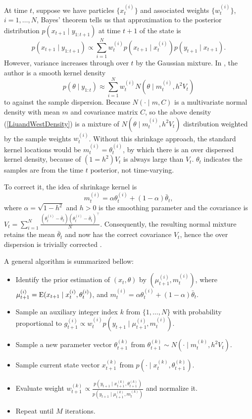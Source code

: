 At time $t$, suppose we have particles $\{x_t^{(i)}\}$ and associated weights $\{w_t^{(i)}\}$, $i=1,\dots,N$, Bayes' theorem tells us that approximation to the posterior distribution $p(x_{t+1}\mid y_{1:t+1})$ at time $t+1$ of the state is 
\begin{equation*}
p(x_{t+1} \mid y_{1:t+1}) \propto \sum_{i=1}^{N} w_t^{(i)} p(x_{t+1} \mid x_t^{(i)})p(y_{t+1}\mid x_{t+1}).
\end{equation*}
However, variance increases through over $t$ by the Gaussian mixture. In \cite{west1993mixture}, the author is a smooth kernel density 
\begin{equation}\label{LiuandWestDensity}
p(\theta\mid y_{1:t})\approx \sum_{i=1}^{N}w_t^{(i)} N(\theta\mid m_t^{(i)},h^2V_t)
\end{equation}
to against the sample dispersion. Because $N(\cdot\mid m,C)$ is a multivariate normal density with mean $m$ and covariance matrix $C$, so the above density (\ref{LiuandWestDensity}) is a mixture of $N(\theta\mid m_t^{(i)},h^2V_t)$ distribution weighted by the sample weights $w_t^{(i)}$. Without this shrinkage approach, the standard kernel locations would be $m_t^{(i)}=\theta_t^{(i)}$, by which there is an over dispersed kernel density, because of $(1=h^2)V_t$ is always large than $V_t$. $\theta_t$ indicates the samples are from the time $t$ posterior, not time-varying. 

To correct it, the idea of shrinkage kernel is 
\begin{equation}
m_t^{(i)}=\alpha \theta_t^{(i)} + (1-\alpha)\bar{\theta}_t,
\end{equation}
where $\alpha=\sqrt{1-h^2}$ and $h>0$ is the smoothing parameter and the covariance is $V_t=\sum_{i=1}^{N}\frac{ (\theta_t^{(i)}-\bar{\theta}_t )(\theta_t^{(i)}-\bar{\theta}_t  )^\top}{N}$. Consequently, the resulting normal mixture retains the mean $\bar{\theta}_t$ and now has the correct covariance $V_t$, hence the over dispersion is trivially corrected \cite{liu2001combined}. 

A general algorithm is summarized bellow: 
\begin{itemize}
\item Identify the prior estimation of $(x_t,\theta)$ by $(\mu_{t+1}^{(i)},m_t^{(i)})$, where
$\mu_{t+1}^{(i)}=\mathrm{E} (x_{t+1}\mid x_t^{(i)},\theta_t^{(i)})$, and $m_t^{(i)}=\alpha \theta_t^{(i)} + (1-\alpha)\bar{\theta}_t$.
\item Sample an auxiliary integer index $k$ from $\{1,\dots,N\}$ with probability proportional to $g_{t+1}^{(i)}\propto w_t^{(i)}p(y_{t+1}\mid \mu_{t+1}^{(i)},m_t^{(i)})$.
\item Sample a new parameter vector $\theta_{t+1}^{(k)}$ from $\theta_{t+1}^{(k)}\sim N(\cdot\mid m_t^{(k)},h^2V_t)$.
\item Sample current state vector $x_{t+1}^{(k)}$ from $p(\cdot\mid x_t^{(k)},\theta_{t+1}^{(k)})$.
\item Evaluate weight $w_{t+1}^{(k)}\propto \frac{ p(y_{t+1}\mid x_{t+1}^{(k)},\theta_{t+1}^{(k)}) }{ p(y_{t+1}\mid \mu_{t+1}^{(k)},m_t^{(k)})   }$ and normalize it. 
\item Repeat until $M$ iterations. 
\end{itemize}



